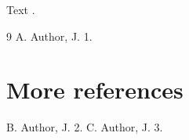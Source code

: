 \documentclass{article}
\begin{document}
Text \cite{a,b,c}.
\begin{thebibliography}{9}
 A. Author, J. 1.
\section*{More references}
 B. Author, J. 2.
 C. Author, J. 3.
\end{thebibliography}
\end{document}
